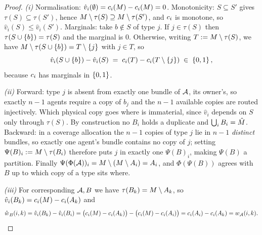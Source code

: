 \begin{proof}
\emph{(i)} Normalisation: $\hat{v}_i(\emptyset) = c_i(M) -
c_i(M) = 0$. Monotonicity: $S \subseteq S'$ gives $\tau(S) \subseteq
\tau(S')$, hence $M \setminus \tau(S) \supseteq M \setminus \tau(S')$,
and $c_i$ is monotone, so $\hat{v}_i(S) \le \hat{v}_i(S')$. Marginals: take
$b \notin S$ of type $j$. If $j \in \tau(S)$ then $\tau(S \cup \left\{b\right\}) =
\tau(S)$ and the marginal is $0$. Otherwise, writing $T := M \setminus
\tau(S)$, we have $M \setminus \tau(S \cup \left\{b\right\}) = T \setminus \left\{j\right\}$
with $j \in T$, so
\[
  \hat{v}_i(S \cup \left\{b\right\}) - \hat{v}_i(S)
  \;=\; c_i(T) - c_i(T \setminus \left\{j\right\}) \;\in\; \left\{0,1\right\},
\]
because $c_i$ has marginals in $\left\{0,1\right\}$.

\emph{(ii)} Forward: type $j$ is absent from exactly one bundle of $\mathcal{A}$, its
owner's, so exactly $n-1$ agents require a copy of $b_j$ and the $n-1$ available
copies are routed injectively. Which physical copy goes where is immaterial,
since $\hat{v}_i$ depends on $S$ only through $\tau(S)$. By construction no
$B_i$ holds a duplicate and $\bigcup_i B_i = \hat{M}$. Backward: in a
coverage allocation the $n-1$ copies of type $j$ lie in $n-1$ \emph{distinct}
bundles, so exactly one agent's bundle contains no copy of $j$; setting
$\Psi(B)_i := M \setminus \tau(B_i)$ therefore puts $j$ in exactly one
$\Psi(B)_i$, making $\Psi(B)$ a partition. Finally $\Psi(\Phi(\mathcal{A}))_i =
M \setminus (M \setminus A_{i}) = A_{i}$, and
$\Phi(\Psi(B))$ agrees with $B$ up to which copy of a type sits where.

\emph{(iii)} For corresponding $\mathcal{A}, B$ we have $\tau(B_k) = M \setminus
A_{k}$, so $\hat{v}_i(B_k) = c_i(M) - c_i(A_{k})$ and
\[
  \hat{w_{}}_B(i,k) = \hat{v}_i(B_k) - \hat{v}_i(B_i)
  = \big(c_i(M) - c_i(A_{k})\big)
  - \big(c_i(M) - c_i(A_{i})\big)
  = c_i(A_{i}) - c_i(A_{k}) = w_{\mathcal{A}}(i,k). \qedhere
\]
\end{proof}


